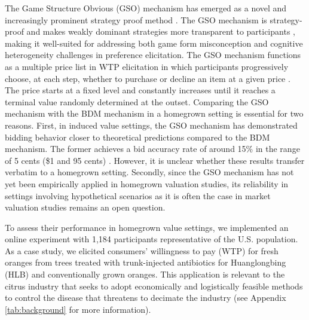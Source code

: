 \documentclass[12pt]{article}
\begin{document}
The Game Structure Obvious (GSO) mechanism has emerged as a novel and increasingly prominent strategy proof method \citep{li_obviously_2017, pycia_theory_2023}. The GSO mechanism is strategy-proof and makes weakly dominant strategies more transparent to participants \citep{chakraborty_future_2025}, making it well-suited for addressing both game form misconception and cognitive heterogeneity challenges in preference elicitation. The GSO mechanism functions as a multiple price list in WTP elicitation in which participants progressively choose, at each step, whether to purchase or decline an item at a given price \citep{yu2021multiple, herberich2012digging, jack2022multiple}. The price starts at a fixed level and constantly increases until it reaches a terminal value randomly determined at the outset.
Comparing the GSO mechanism with the BDM mechanism in a homegrown setting is essential for two reasons. First, in induced value settings, the GSO mechanism has demonstrated  bidding behavior closer to theoretical predictions compared to the BDM mechanism. The former achieves a bid accuracy rate of around 15\% in the range of 5 cents (\$1 and 95 cents) \citep{chakraborty_future_2025}. However, it is unclear whether these results transfer verbatim to a homegrown setting. Secondly, since the GSO mechanism has not yet been empirically applied in homegrown valuation studies, its reliability in settings involving hypothetical scenarios as it is often the case in market valuation studies remains an open question.

To assess their performance in homegrown value settings, we implemented an online experiment with 1,184 participants representative of the U.S. population. As a case study, we elicited consumers' willingness to pay (WTP) for fresh oranges from trees treated with trunk-injected antibiotics for Huanglongbing (HLB) and conventionally grown oranges. This application is relevant to the citrus industry that seeks to adopt economically and logistically feasible methods to control the disease that threatens to decimate the industry  (see Appendix \ref{tab:background} for more information).
\end{document}
